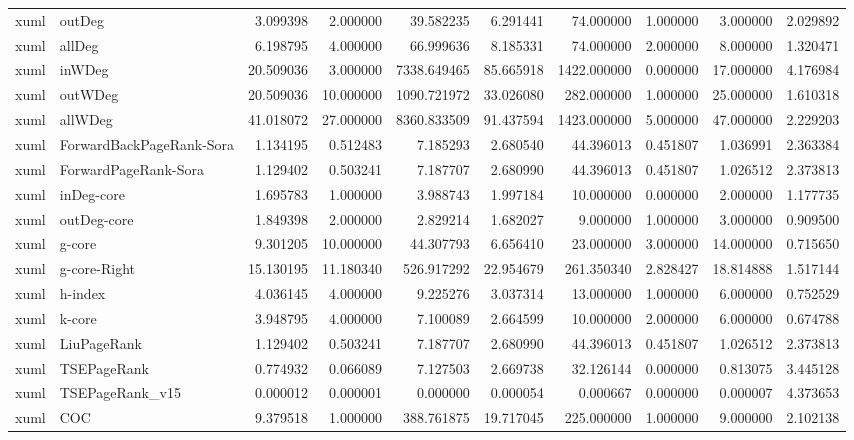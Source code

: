 \begin{tabular}{llrrrrrrrr}
xuml & outDeg & 3.099398 & 2.000000 & 39.582235 & 6.291441 & 74.000000 & 1.000000 & 3.000000 & 2.029892 \\
xuml & allDeg & 6.198795 & 4.000000 & 66.999636 & 8.185331 & 74.000000 & 2.000000 & 8.000000 & 1.320471 \\
xuml & inWDeg & 20.509036 & 3.000000 & 7338.649465 & 85.665918 & 1422.000000 & 0.000000 & 17.000000 & 4.176984 \\
xuml & outWDeg & 20.509036 & 10.000000 & 1090.721972 & 33.026080 & 282.000000 & 1.000000 & 25.000000 & 1.610318 \\
xuml & allWDeg & 41.018072 & 27.000000 & 8360.833509 & 91.437594 & 1423.000000 & 5.000000 & 47.000000 & 2.229203 \\
xuml & ForwardBackPageRank-Sora & 1.134195 & 0.512483 & 7.185293 & 2.680540 & 44.396013 & 0.451807 & 1.036991 & 2.363384 \\
xuml & ForwardPageRank-Sora & 1.129402 & 0.503241 & 7.187707 & 2.680990 & 44.396013 & 0.451807 & 1.026512 & 2.373813 \\
xuml & inDeg-core & 1.695783 & 1.000000 & 3.988743 & 1.997184 & 10.000000 & 0.000000 & 2.000000 & 1.177735 \\
xuml & outDeg-core & 1.849398 & 2.000000 & 2.829214 & 1.682027 & 9.000000 & 1.000000 & 3.000000 & 0.909500 \\
xuml & g-core & 9.301205 & 10.000000 & 44.307793 & 6.656410 & 23.000000 & 3.000000 & 14.000000 & 0.715650 \\
xuml & g-core-Right & 15.130195 & 11.180340 & 526.917292 & 22.954679 & 261.350340 & 2.828427 & 18.814888 & 1.517144 \\
xuml & h-index & 4.036145 & 4.000000 & 9.225276 & 3.037314 & 13.000000 & 1.000000 & 6.000000 & 0.752529 \\
xuml & k-core & 3.948795 & 4.000000 & 7.100089 & 2.664599 & 10.000000 & 2.000000 & 6.000000 & 0.674788 \\
xuml & LiuPageRank & 1.129402 & 0.503241 & 7.187707 & 2.680990 & 44.396013 & 0.451807 & 1.026512 & 2.373813 \\
xuml & TSEPageRank & 0.774932 & 0.066089 & 7.127503 & 2.669738 & 32.126144 & 0.000000 & 0.813075 & 3.445128 \\
xuml & TSEPageRank_v15 & 0.000012 & 0.000001 & 0.000000 & 0.000054 & 0.000667 & 0.000000 & 0.000007 & 4.373653 \\
xuml & COC & 9.379518 & 1.000000 & 388.761875 & 19.717045 & 225.000000 & 1.000000 & 9.000000 & 2.102138 \\
\bottomrule
\end{tabular}
